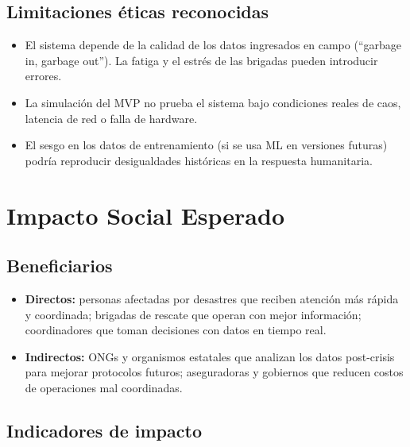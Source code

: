 \documentclass[12pt,a4paper]{article}
\begin{document}
\subsection{Limitaciones éticas reconocidas}

\begin{itemize}[leftmargin=1.5em]
  \item El sistema depende de la calidad de los datos ingresados en campo
        (``garbage in, garbage out''). La fatiga y el estrés de las brigadas
        pueden introducir errores.
  \item La simulación del MVP no prueba el sistema bajo condiciones reales de
        caos, latencia de red o falla de hardware.
  \item El sesgo en los datos de entrenamiento (si se usa ML en versiones
        futuras) podría reproducir desigualdades históricas en la respuesta
        humanitaria.
\end{itemize}

\section{Impacto Social Esperado}

\subsection{Beneficiarios}

\begin{itemize}[leftmargin=1.5em]
  \item \textbf{Directos:} personas afectadas por desastres que reciben
        atención más rápida y coordinada; brigadas de rescate que operan con
        mejor información; coordinadores que toman decisiones con datos en
        tiempo real.
  \item \textbf{Indirectos:} ONGs y organismos estatales que analizan los
        datos post-crisis para mejorar protocolos futuros; aseguradoras y
        gobiernos que reducen costos de operaciones mal coordinadas.
\end{itemize}

\subsection{Indicadores de impacto}
\end{document}
